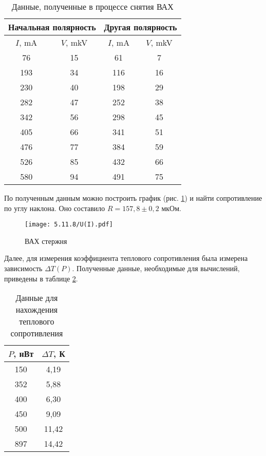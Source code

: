 \documentclass[a4paper,12pt]{article} %
\begin{document}
\begin{table}[H]
    \centering
    \begin{tabular}{|c|c|c|c|}
    \hline
        \multicolumn{2}{|c|}{Начальная полярность} & \multicolumn{2}{|c|}{Другая полярность} \\ \hline
        $I$, mA & $V$, mkV & $I$, mA & $V$, mkV \\ \hline
        76  & 15  & 61 & 7  \\ \hline
        193 & 34 & 116 & 16 \\ \hline
        230 & 40 & 198 & 29 \\ \hline
        282 & 47 & 252 & 38 \\ \hline
        342 & 56 & 298 & 45 \\ \hline
        405 & 66 & 341 & 51 \\ \hline
        476 & 77 & 384 & 59 \\ \hline
        526 & 85 & 432 & 66 \\ \hline
        580 & 94 & 491 & 75 \\ \hline
    \end{tabular}
    \caption{Данные, полученные в процессе снятия ВАХ}
    \label{vah1}
\end{table}

По полученным данным можно построить график (рис. \ref{graph}) и найти сопротивление по углу наклона. Оно составило $R = 157,8 \pm 0,2$ мкОм.

\begin{figure}[H]
    \centering
    \texttt{[image: 5.11.8/U(I).pdf]}
    \caption{ВАХ стержня}
    \label{graph}
\end{figure}

Далее, для измерения коэффициента теплового сопротивления была измерена зависимость $\Delta T(P)$. Полученные данные, необходимые для вычислений, приведены в таблице \ref{table}.

\begin{table}[H]
    \centering
    \begin{tabular}{|c|c|}
    \hline
        $P$, нВт & $\Delta T$, К \\ \hline
        150 & 4,19 \\ \hline
        352 & 5,88 \\ \hline
        400 & 6,30 \\ \hline
        450 & 9,09 \\ \hline
        500 & 11,42 \\ \hline
        897 & 14,42 \\ \hline
    \end{tabular}
    \caption{Данные для нахождения теплового сопротивления}
    \label{table}
\end{table}
\end{document}
